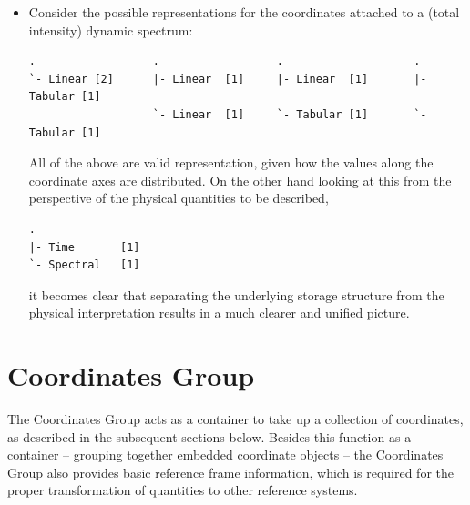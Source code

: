 \documentclass[a4paper,10pt,bibtotoc]{scrreprt}
\begin{document}
\begin{itemize}
\item Consider the possible representations for the coordinates
  attached to a (total intensity) dynamic spectrum:
\begin{lstlisting}
.                  .                  .                    .
`- Linear [2]      |- Linear  [1]     |- Linear  [1]       |- Tabular [1]
                   `- Linear  [1]     `- Tabular [1]       `- Tabular [1]
\end{lstlisting}
  All of the above are valid representation, given how the values
  along the coordinate axes are distributed. On the other hand looking at
  this from the perspective of the physical quantities to be described,
\begin{lstlisting}
.
|- Time       [1]
`- Spectral   [1]
\end{lstlisting}
it becomes clear that separating the underlying storage structure from
the physical interpretation results in a much clearer and unified picture.
\end{itemize}

\section{Coordinates Group}
\label{sec:coordinates-group}

The Coordinates Group acts as a container to take up a collection of coordinates,
as described in the subsequent sections below. Besides this function as a
container -- grouping together embedded coordinate objects -- the
Coordinates Group also provides basic reference frame information,
which is required for the proper transformation of quantities to other
reference systems.
\end{document}
